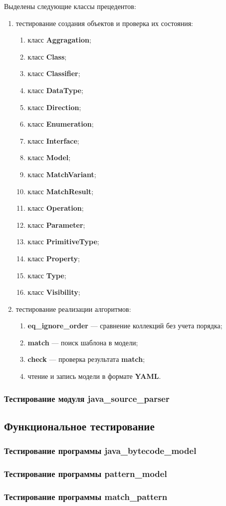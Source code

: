 Выделены следующие классы прецедентов:
\begin{enumerate}
    \item тестирование создания объектов и проверка их состояния:
    \begin{enumerate}
        \item класс \textbf{Aggragation};
        \item класс \textbf{Class};
        \item класс \textbf{Classifier};
        \item класс \textbf{DataType};
        \item класс \textbf{Direction};
        \item класс \textbf{Enumeration};
        \item класс \textbf{Interface};
        \item класс \textbf{Model};
        \item класс \textbf{MatchVariant};
        \item класс \textbf{MatchResult};
        \item класс \textbf{Operation};
        \item класс \textbf{Parameter};
        \item класс \textbf{PrimitiveType};
        \item класс \textbf{Property};
        \item класс \textbf{Type};
        \item класс \textbf{Visibility};
    \end{enumerate}
    \item тестирование реализации алгоритмов:
    \begin{enumerate}
        \item \textbf{eq\_ignore\_order} --- сравнение коллекций без учета порядка;
        \item \textbf{match} --- поиск шаблона в модели;
        \item \textbf{check} --- проверка результата \textbf{match};
        \item чтение и запись модели в формате \textbf{YAML}.
    \end{enumerate}
\end{enumerate}

\subsubsection{Тестирование модуля java\_source\_parser}

\subsection{Функциональное тестирование}

\subsubsection{Тестирование программы java\_bytecode\_model}

\subsubsection{Тестирование программы pattern\_model}

\subsubsection{Тестирование программы match\_pattern}
